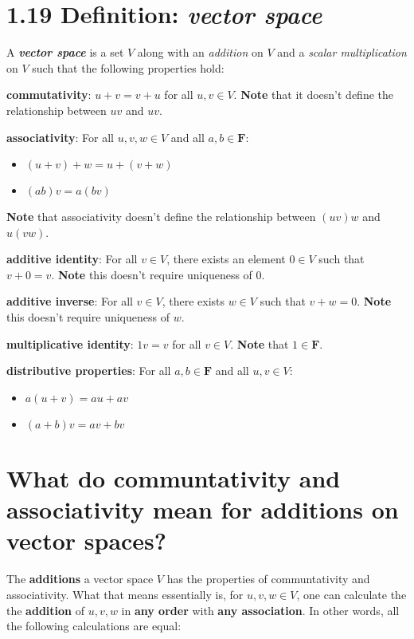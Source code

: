 \documentclass[12pt, letterpaper, oneside]{book}
\begin{document}
\section{1.19 Definition: \textbf{\textit{vector space}}}

A \textbf{\textit{vector space}} is a set $V$ along with an \textit{addition}
on $V$ and a \textit{scalar multiplication} on $V$ such that the following
properties hold:

\textbf{commutativity}: $u + v = v + u$ for all $u, v \in V$. \textbf{Note}
that it doesn't define the relationship between $uv$ and $uv$.

\textbf{associativity}: For all $u, v, w \in V$ and all $a, b \in \mathbf{F}$:
\begin{itemize}
  \item $(u + v) + w = u + (v + w)$
  \item $(ab)v = a(bv)$
\end{itemize}

\textbf{Note} that associativity doesn't define the relationship between
$(uv)w$ and $u(vw)$.

\textbf{additive identity}: For all $v \in V$, there exists an element $0 \in V$
such that $v + 0 = v$. \textbf{Note} this doesn't require uniqueness of $0$.

\textbf{additive inverse}: For all $v \in V$, there exists $w \in V$ such that
$v + w = 0$. \textbf{Note} this doesn't require uniqueness of $w$.

\textbf{multiplicative identity}: $1v = v$ for all $v \in V$. \textbf{Note}
  that $1 \in \mathbf{F}$.

\textbf{distributive properties}: For all $a, b \in \mathbf{F}$ and all $u, v
\in V$:
\begin{itemize}
  \item $a(u + v) = au + av$
  \item $(a + b)v = av + bv$
\end{itemize}

\section{What do communtativity and associativity mean for additions on vector
  spaces?}

The \textbf{additions} a vector space $V$ has the properties of communtativity
and associativity. What that means essentially is, for $u, v, w \in V$, one can
calculate the the \textbf{addition} of $u, v, w$ in \textbf{any order} with
\textbf{any association}. In other words, all the following calculations are
equal:
\end{document}

